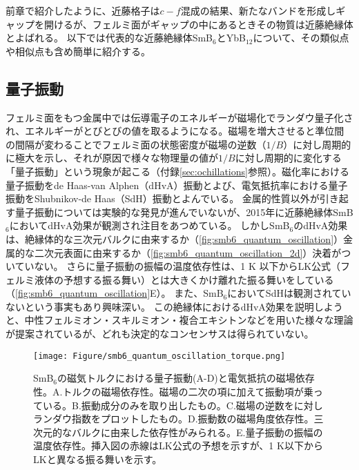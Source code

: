 前章で紹介したように、近藤格子は$c-f$混成の結果、新たなバンドを形成しギャップを開けるが、フェルミ面がギャップの中にあるときその物質は近藤絶縁体とよばれる。
以下では代表的な近藤絶縁体SmB$_{6}$とYbB$_{12}$について、その類似点や相似点も含め簡単に紹介する。

\subsection{量子振動}
フェルミ面をもつ金属中では伝導電子のエネルギーが磁場化でランダウ量子化され、エネルギーがとびとびの値を取るようになる。磁場を増大させると準位間の間隔が変わることでフェルミ面の状態密度が磁場の逆数（$1/B$）に対し周期的に極大を示し、それが原因で様々な物理量の値が$1/B$に対し周期的に変化する「量子振動」という現象が起こる（付録\ref{sec:ochillations}参照）。磁化率における量子振動をde Haas-van Alphen（dHvA）振動とよび、電気抵抗率における量子振動をShubnikov-de Haas（SdH）振動とよんでいる。
金属的性質以外が引き起す量子振動については実験的な発見が進んでいないが、2015年に近藤絶縁体SmB$_6$においてdHvA効果が観測され注目をあつめている。
しかしSmB$_6$のdHvA効果は、絶縁体的な三次元バルクに由来するか\cite{smb6_quantum_oscillation}（\autoref{fig:smb6_quantum_oscillation}）金属的な二次元表面に由来するか\cite{SmB6_byLi}（\autoref{fig:smb6_quantum_oscillation_2d}）決着がついていない。
さらに量子振動の振幅の温度依存性は、1 K 以下からLK公式（フェルミ液体の予想する振る舞い）とは大きくかけ離れた振る舞いをしている\cite{smb6_quantum_oscillation}（\autoref{fig:smb6_quantum_oscillation}E）。
また、SmB$_6$においてSdHは観測されていないという事実もあり興味深い\cite{smb6_noSdH}。
この絶縁体におけるdHvA効果を説明しようと、中性フェルミオン・スキルミオン・複合エキシトンなどを用いた様々な理論が提案されているが、どれも決定的なコンセンサスは得られていない。
\begin{figure*}[!thb]
	\begin{center}
		\texttt{[image: Figure/smb6\_quantum\_oscillation\_torque.png]}
\caption{\small{SmB$_6$の磁気トルクにおける量子振動(A-D)と電気抵抗の磁場依存性\cite{smb6_quantum_oscillation}。A.トルクの磁場依存性。磁場の二次の項に加えて振動項が乗っている。B.振動成分のみを取り出したもの。C.磁場の逆数をに対しランダウ指数をプロットしたもの。D.振動数の磁場角度依存性。三次元的なバルクに由来した依存性がみられる。E.量子振動の振幅の温度依存性。挿入図の赤線はLK公式の予想を示すが、1 K以下からLKと異なる振る舞いを示す。}}
\label{fig:smb6_quantum_oscillation}
    \end{center}
\end{figure*}

